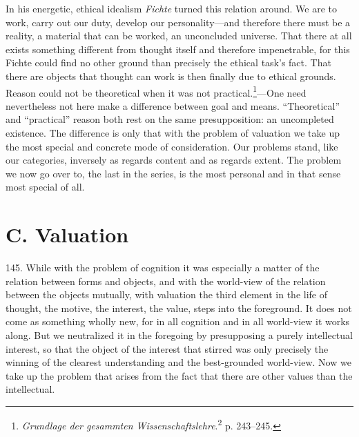 \documentclass[12pt,a4paper]{book}
\newcommand{\opage}[1]{\marginnote{\footnotesize\textit{[#1]}}}
\begin{document}
In his energetic, ethical idealism \emph{Fichte} turned this relation around. We are to work, carry out
our duty, develop our personality---and therefore there must be a reality, a material that can be worked,
an unconcluded universe. That there at all exists something different from thought itself and therefore
impenetrable, for this Fichte could find no other ground than precisely the ethical task's fact. That
there are objects that thought can work is then finally due to ethical grounds. Reason could not be
theoretical when it was not practical.\footnote{\emph{Grundlage der gesammten
Wissenschaftslehre}.\textsuperscript{2} p. 243--245.}---One need nevertheless not here make a difference
between goal and means. ``Theoretical'' and ``practical'' reason both rest on the same presupposition: an
uncompleted existence. The difference is only that with the problem of valuation we take up the most
special and concrete mode of consideration. Our problems stand, like our categories, inversely as regards
content and as regards extent. The problem we now go over to, the last in the series, is the most personal
and in that sense most special of all.

\section*{C. Valuation}
\label{sec:vurdering}

\opage{346}145. While with the problem of cognition it was especially a matter of the relation between
forms and objects, and with the world-view of the relation between the objects mutually, with
valuation the third element in the life of thought, the motive, the interest, the value, steps
into the foreground. It does not come as something wholly new, for in all cognition and in all world-view it works along. But we neutralized it in the foregoing by presupposing a purely
intellectual interest, so that the object of the interest that stirred was only precisely the
winning of the clearest understanding and the best-grounded world-view. Now we take up the
problem that arises from the fact that there are other values than the intellectual.
\end{document}
